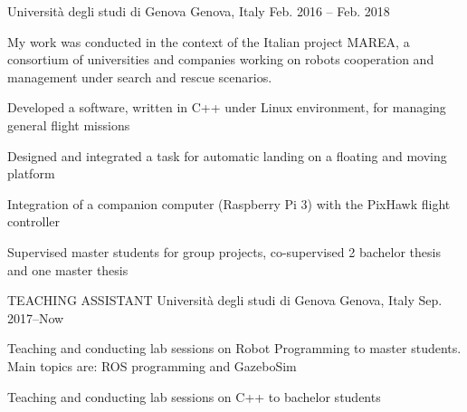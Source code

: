 \begin{cventries}
    {Università degli studi di Genova} %
    {Genova, Italy} %
    {Feb. 2016 – Feb. 2018} %
    {
      \begin{cvparagraph}
      My work was conducted in the context of the Italian project MAREA, a consortium of universities and companies working on robots cooperation and management under search and rescue scenarios.
      \end{cvparagraph}
      \begin{cvitems} %
        \item {Developed a software, written in C++ under Linux environment, for managing general flight missions}
        \item {Designed and integrated a task for  automatic landing on a floating and moving platform}
        \item {Integration of a companion computer (Raspberry Pi 3) with the PixHawk flight controller}
        \item {Supervised master students for group projects, co-supervised 2 bachelor thesis and one master thesis}
     \end{cvitems}
    }
    \vspace{10pt}  
  \cventry
    {TEACHING ASSISTANT} %
    {Università degli studi di Genova} %
    {Genova, Italy} %
    {Sep. 2017–Now} %
    {
      \begin{cvitems} %
        \item {Teaching and conducting lab sessions on Robot Programming to master students. Main topics are: ROS programming and GazeboSim}
        \item {Teaching and conducting lab sessions on C++ to bachelor students}
      \end{cvitems}
    }


\end{cventries}
